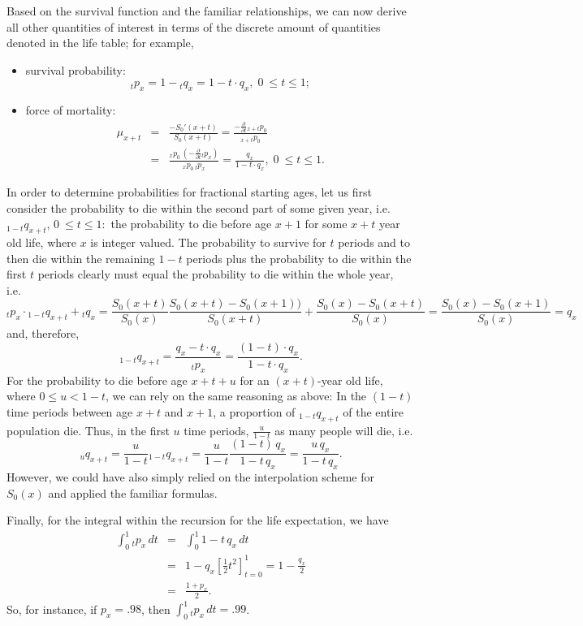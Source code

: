 \documentclass[11pt,fleqn,oneside]{book}
\begin{document}
Based on the survival function and the familiar relationships, we can now derive all other quantities of interest in terms of the discrete amount of quantities denoted in the life table; for example,
\begin{itemize}
\item survival probability:
$$
{_tp_x} = 1- {_tq_x} = 1 - t\cdot q_x, \;0\ \leq t \leq 1;
$$
\item force of mortality:
\begin{eqnarray*}
\mu_{x+t} &=& \frac{-S_0'(x+t)}{S_0(x+t)} = \frac{-\frac{\partial}{\partial t}{_{x+t}p_0}}{{_{x+t}p_0}} \\
&=& \frac{{_xp_0}\,\left(-\frac{\partial}{\partial t}{_tp_x}\right)}{{_xp_0}\,{_{t}p_x}} = \frac{q_x}{1-t\cdot q_x}, \;0\ \leq t \leq 1.
\end{eqnarray*}
\end{itemize} 

In order to determine probabilities for fractional starting ages, let us first consider the probability to die within the second part of some given year, i.e.\ $_{1-t}q_{x+t}$, $0\ \leq t \leq 1:$ the probability to die before age $x+1$ for some $x+t$ year old life, where $x$ is integer valued. The probability to survive for $t$ periods and to then die within the remaining $1-t$ periods plus the probability to die within the first $t$ periods clearly must equal the probability to die within the whole year, i.e.\
$$
{_tp_x} \cdot {_{1-t}q_{x+t}} + {_tq_x}
=\frac{S_0(x+t)}{S_0(x)}\frac{S_0(x+t) - S_0(x+1))}{S_0(x+t)} + \frac{S_0(x)-S_0(x+t)}{S_0(x)}
= \frac{S_0(x) - S_0(x+1)}{S_0(x)} = {q_x}
$$
and, therefore,
$$
{_{1-t}q_{x+t}} = \frac{q_x - t\cdot q_x}{_tp_x} = \frac{(1-t)\cdot q_x}{1-t\cdot q_x}.
$$
For the probability to die before age $x+t+u$ for an $(x+t)$-year old life, where $0 \leq u < 1-t$, we can rely on the same reasoning as above: In the $(1-t)$ time periods between age $x+t$ and $x+1$, a proportion of $_{1-t}q_{x+t}$ of the entire population die. Thus, in the first $u$ time periods, $\frac{u}{1-t}$ as many people will die, i.e.
$$
{_{u}q_{x+t}} = \frac{u}{1-t} {_{1-t}q_{x+t}} = \frac{u}{1-t}\frac{(1-t)\,q_x}{1-t\,q_x} = 
\frac{u\,q_x}{1-t\,q_x}.
$$
However, we could have also simply relied on the interpolation scheme for $S_0(x)$ and applied  the familiar formulas.

Finally, for the integral within the recursion for the life expectation, we have
\begin{eqnarray*}
\int_0^1 {_tp_x}\,dt &=& \int_0^1 1 - t\,q_x\,dt \\ 
&=& 1 - q_x \left[\frac{1}{2}t^2\right]_{t=0}^1 = 1 - \frac{q_x}{2}  \\
&=& \frac{1 + p_x}{2}.
\end{eqnarray*}
So, for instance, if $p_x = .98$, then $\int_0^1 {_tp_x}\,dt = .99$.
\end{document}
